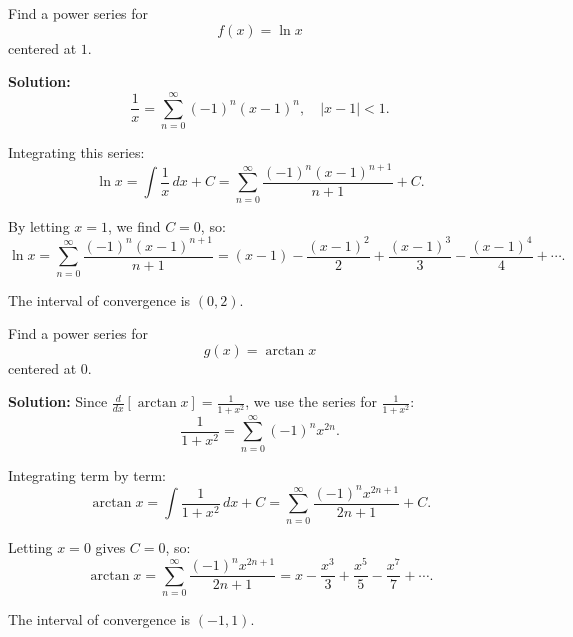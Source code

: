 \documentclass[12pt]{article}
\theoremstyle{beautifulthm}
\begin{document}
\begin{tcolorbox}[colback=examplebg, colframe=red!75!black, title=\textbf{EXAMPLE 3: Finding a Power Series by Integration}, fonttitle=\bfseries, sharp corners]

Find a power series for 
\[
f(x) = \ln x
\]
centered at $1$.

\tcblower
\textbf{Solution:} 
\[
\frac{1}{x} = \sum_{n=0}^\infty (-1)^n(x - 1)^n, \quad |x - 1| < 1.
\]

Integrating this series:
\[
\ln x = \int \frac{1}{x} \, dx + C = \sum_{n=0}^\infty \frac{(-1)^n (x - 1)^{n+1}}{n + 1} + C.
\]

By letting $x = 1$, we find $C = 0$, so:
\[
\ln x = \sum_{n=0}^\infty \frac{(-1)^n (x - 1)^{n+1}}{n + 1} = (x - 1) - \frac{(x - 1)^2}{2} + \frac{(x - 1)^3}{3} - \frac{(x - 1)^4}{4} + \cdots.
\]

The interval of convergence is $(0, 2)$.
\end{tcolorbox}


\begin{tcolorbox}[colback=examplebg, colframe=red!75!black, title=\textbf{EXAMPLE 4: Finding a Power Series by Integration}, fonttitle=\bfseries, sharp corners]

Find a power series for 
\[
g(x) = \arctan x
\]
centered at $0$.


\tcblower
\textbf{Solution:} 
Since $\frac{d}{dx}[\arctan x] = \frac{1}{1 + x^2}$, we use the series for $\frac{1}{1 + x^2}$:
\[
\frac{1}{1 + x^2} = \sum_{n=0}^\infty (-1)^n x^{2n}.
\]

Integrating term by term:
\[
\arctan x = \int \frac{1}{1 + x^2} \, dx + C = \sum_{n=0}^\infty \frac{(-1)^n x^{2n+1}}{2n + 1} + C.
\]

Letting $x = 0$ gives $C = 0$, so:
\[
\arctan x = \sum_{n=0}^\infty \frac{(-1)^n x^{2n+1}}{2n + 1} = x - \frac{x^3}{3} + \frac{x^5}{5} - \frac{x^7}{7} + \cdots.
\]

The interval of convergence is $(-1, 1)$.
\end{tcolorbox}
\end{document}
